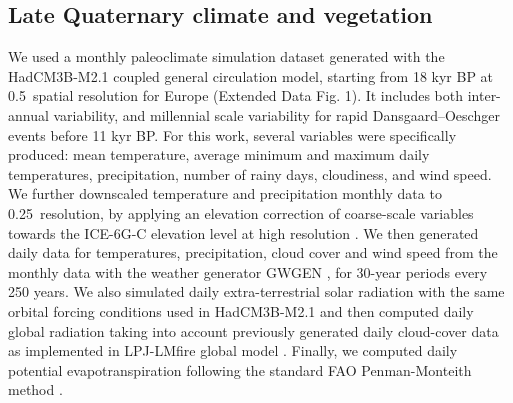 \documentclass[pdflatex, sn-nature]{sn-jnl}%
\begin{document}
\subsection{Late Quaternary climate and vegetation}\label{paleodata}
We used a monthly paleoclimate simulation dataset \cite{Armstrong2019} generated with the HadCM3B-M2.1 coupled general circulation model, starting from 18 kyr BP at 0.5\degree~spatial resolution for Europe (Extended Data Fig. 1). It includes both inter-annual variability, and millennial scale variability for rapid Dansgaard–Oeschger events before 11 kyr BP. For this work, several variables were specifically produced: mean temperature, average minimum and maximum daily temperatures, precipitation, number of rainy days, cloudiness, and wind speed. We further downscaled temperature and precipitation monthly data to 0.25\degree~resolution, by applying an elevation correction of coarse-scale variables towards the ICE-6G-C elevation level at high resolution \cite{Peltier2015}.  
We then generated daily data for temperatures, precipitation, cloud cover and wind speed from  the monthly data with the weather generator GWGEN \cite{Sommer2017}, for 30-year periods every 250 years. We also simulated daily extra-terrestrial solar radiation with the same orbital forcing conditions used in HadCM3B-M2.1 \cite{Armstrong2019} and then computed daily global radiation taking into account previously generated daily cloud-cover data as implemented in LPJ-LMfire global model \cite{Pfeiffer2013}. Finally, we computed daily potential evapotranspiration following the standard FAO Penman-Monteith method \cite{Allen1998}.  
\end{document}
